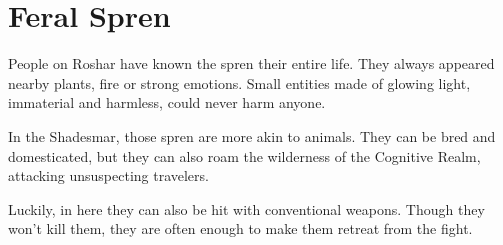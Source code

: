 \section{Feral Spren}
\label{enemyWildSpren}

People on Roshar have known the spren their entire life. They always appeared nearby plants, fire or strong emotions. Small entities made of glowing light, immaterial and harmless, could never harm anyone.

In the Shadesmar, those spren are more akin to animals. They can be bred and domesticated, but they can also roam the wilderness of the Cognitive Realm, attacking unsuspecting travelers.

Luckily, in here they can also be hit with conventional weapons. Though they won't kill them, they are often enough to make them retreat from the fight.


\newpage

\newpage

\newpage

\newpage

\newpage

\newpage

\newpage


